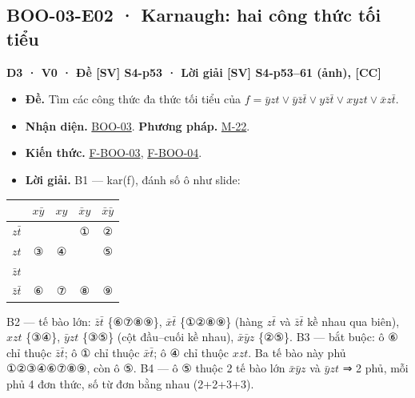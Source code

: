 \documentclass[
  10pt,
  twoside,openany]{book}
\providecommand{\tightlist}{%
  \setlength{\itemsep}{0pt}\setlength{\parskip}{0pt}}
\begin{document}
\hypertarget{BOO-03-E02}{%
\subsection{BOO-03-E02 · Karnaugh: hai công thức tối
tiểu}\label{BOO-03-E02}}

\textbf{D3 · V0 · Đề {[}SV{]} S4-p53 · Lời giải {[}SV{]} S4-p53--61
(ảnh), {[}CC{]}}

\begin{itemize}
\tightlist
\item
  \textbf{Đề.} Tìm các công thức đa thức tối tiểu của
  \(f=\bar yzt\vee\bar y\bar z\bar t\vee y\bar z\bar t\vee xyzt\vee\bar xz\bar t\).
\item
  \textbf{Nhận diện.} \protect\hyperlink{BOO-03}{BOO-03}. \textbf{Phương
  pháp.} \protect\hyperlink{M-22}{M-22}.
\item
  \textbf{Kiến thức.} \protect\hyperlink{F-BOO-03}{F-BOO-03},
  \protect\hyperlink{F-BOO-04}{F-BOO-04}.
\item
  \textbf{Lời giải.} B1 --- kar(f), đánh số ô như slide:
\end{itemize}

\begin{longtable}[]{@{}lcccc@{}}
\toprule\noalign{}
& \(x\bar y\) & \(xy\) & \(\bar xy\) & \(\bar x\bar y\) \\
\midrule\noalign{}
\endhead
\bottomrule\noalign{}
\endlastfoot
\(z\bar t\) & & & ① & ② \\
\(zt\) & ③ & ④ & & ⑤ \\
\(\bar zt\) & & & & \\
\(\bar z\bar t\) & ⑥ & ⑦ & ⑧ & ⑨ \\
\end{longtable}

B2 --- tế bào lớn: \(\bar z\bar t\) \{⑥⑦⑧⑨\}, \(\bar x\bar t\) \{①②⑧⑨\}
(hàng \(z\bar t\) và \(\bar z\bar t\) kề nhau qua biên), \(xzt\) \{③④\},
\(\bar yzt\) \{③⑤\} (cột đầu--cuối kề nhau), \(\bar x\bar yz\) \{②⑤\}.
B3 --- bắt buộc: ô ⑥ chỉ thuộc \(\bar z\bar t\); ô ① chỉ thuộc
\(\bar x\bar t\); ô ④ chỉ thuộc \(xzt\). Ba tế bào này phủ ①②③④⑥⑦⑧⑨, còn
ô ⑤. B4 --- ô ⑤ thuộc 2 tế bào lớn \(\bar x\bar yz\) và \(\bar yzt\) ⇒ 2
phủ, mỗi phủ 4 đơn thức, số từ đơn bằng nhau (2+2+3+3).
\end{document}
